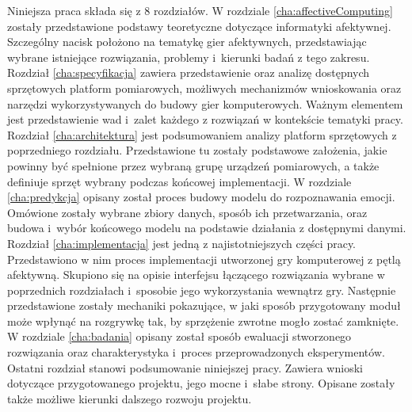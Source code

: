 Niniejsza praca składa się z 8 rozdziałów. W rozdziale \ref{cha:affectiveComputing} zostały przedstawione podstawy teoretyczne dotyczące informatyki afektywnej. Szczególny nacisk położono na tematykę gier afektywnych, przedstawiając wybrane istniejące rozwiązania, problemy i~kierunki badań z tego zakresu. Rozdział \ref{cha:specyfikacja} zawiera przedstawienie oraz analizę dostępnych sprzętowych platform pomiarowych, możliwych mechanizmów wnioskowania oraz narzędzi wykorzystywanych do budowy gier komputerowych. Ważnym elementem jest przedstawienie wad i~zalet każdego z rozwiązań w kontekście tematyki pracy. Rozdział \ref{cha:architektura} jest podsumowaniem analizy platform sprzętowych z poprzedniego rozdziału. Przedstawione tu zostały podstawowe założenia, jakie powinny być spełnione przez wybraną grupę urządzeń pomiarowych, a także definiuje sprzęt wybrany podczas końcowej implementacji. W rozdziale \ref{cha:predykcja} opisany został proces budowy modelu do rozpoznawania emocji. Omówione zostały wybrane zbiory danych, sposób ich przetwarzania, oraz budowa i~wybór końcowego modelu na podstawie działania z dostępnymi danymi. Rozdział \ref{cha:implementacja} jest jedną z najistotniejszych części pracy. Przedstawiono w nim proces implementacji utworzonej gry komputerowej z pętlą afektywną. Skupiono się na opisie interfejsu łączącego rozwiązania wybrane w poprzednich rozdziałach i~sposobie jego wykorzystania wewnątrz gry. Następnie przedstawione zostały mechaniki pokazujące, w jaki sposób przygotowany moduł może wpłynąć na rozgrywkę tak, by sprzężenie zwrotne mogło zostać zamknięte. W rozdziale \ref{cha:badania} opisany został sposób ewaluacji stworzonego rozwiązania oraz charakterystyka i~proces przeprowadzonych eksperymentów. Ostatni rozdział stanowi podsumowanie niniejszej pracy. Zawiera wnioski dotyczące przygotowanego projektu, jego mocne i~słabe strony. Opisane zostały także możliwe kierunki dalszego rozwoju projektu. 
